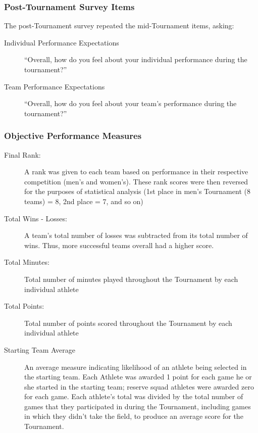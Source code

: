 \subsubsection{\label{app5:surveyPost}Post-Tournament Survey Items}
The post-Tournament survey repeated the mid-Tournament items, asking:
\begin{description}
\item [Individual Performance Expectations] ``Overall, how do you feel about your individual performance during the tournament?''
\item [Team Performance Expectations]``Overall, how do you feel about your team's performance during the tournament?''
\end{description}




\subsubsection{\label{app5:objectivePerformance}Objective Performance Measures}

\begin{description}
\item [Final Rank:] A rank was given to each team based on performance in their respective competition (men's and women's). These rank scores were then reversed for the purposes of statistical analysis (1st place in men's Tournament (8 teams) = 8, 2nd place = 7, and so on)
\item [Total Wins - Losses:] A team's total number of losses was subtracted from its total number of wins.  Thus, more successful teams overall had a higher score.
\item [Total Minutes:] Total number of minutes played throughout the Tournament by each individual athlete
\item [Total Points:] Total number of points scored throughout the Tournament by each individual athlete
\item [Starting Team Average] An average measure indicating likelihood of an athlete being selected in the starting team. Each Athlete was awarded 1 point for each game he or she started in the starting team; reserve squad athletes were awarded zero for each game. Each athlete's total was divided by the total number of games that they participated in during the Tournament, including games in which they didn't take the field, to produce an average score for the Tournament.
\end{description}





